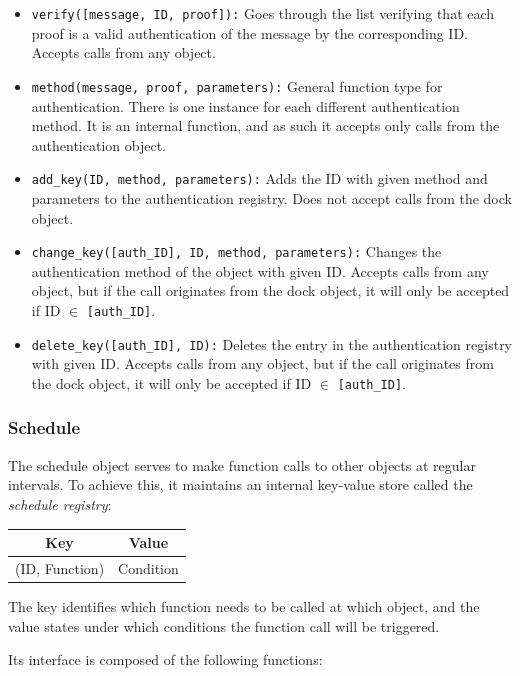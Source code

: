 \documentclass[conference]{IEEEtran}
\begin{document}
\begin{itemize}
	\item \texttt{verify([message, ID, proof]):} Goes through the list verifying that each proof is a valid  authentication of the message by the corresponding ID. Accepts calls from any object.
	\item \texttt{method(message, proof, parameters):} General function type for authentication. There is one instance for each different authentication method. It is an internal function, and as such it accepts only calls from the authentication object.
	\item \texttt{add\_key(ID, method, parameters):} Adds the ID with given method and parameters to the authentication registry. Does not accept calls from the dock object.
	\item \texttt{change\_key([auth\_ID], ID, method, parameters):} Changes the authentication method of the object with given ID. Accepts calls from any object, but if the call originates from the dock object, it will only be accepted if ID $\in$ \texttt{[auth\_ID]}.
	\item \texttt{delete\_key([auth\_ID], ID):} Deletes the entry in the authentication registry with given ID. Accepts calls from any object, but if the call originates from the dock object, it will only be accepted if ID $\in$ \texttt{[auth\_ID]}.
\end{itemize}

\subsubsection{Schedule}
The schedule object serves to make function calls to other objects at regular intervals. To achieve this, it maintains an internal key-value store called the \textit{schedule registry}:

\begin{center}
	\begin{tabular}[c]{c|c}
		Key & Value \\
		\hline
		(ID, Function) & Condition \\
	\end{tabular}
\end{center}

The key identifies which function needs to be called at which object, and the value states under which conditions the function call will be triggered.

Its interface is composed of the following functions:
\end{document}
